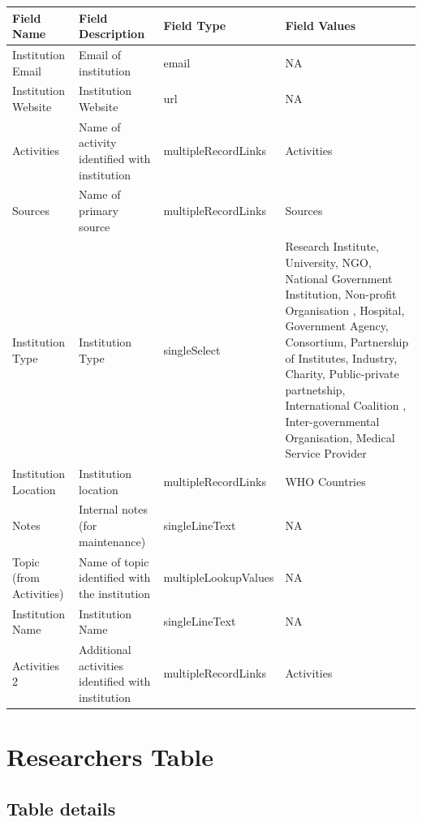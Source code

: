 \documentclass[
]{book}
\begin{document}
\begin{table}
\centering
\begin{tabular}{l|l|l|l}
\hline
\textbf{Field Name} & \textbf{Field Description} & \textbf{Field Type} & \textbf{Field Values}\\
\hline
Institution Email & Email of institution & email & NA\\
\hline
Institution Website & Institution Website & url & NA\\
\hline
Activities & Name of activity identified with institution & multipleRecordLinks & Activities\\
\hline
Sources & Name of primary source & multipleRecordLinks & Sources\\
\hline
Institution Type & Institution Type & singleSelect & Research Institute, University, NGO, National Government Institution, Non-profit Organisation , Hospital, Government Agency, Consortium, Partnership of Institutes, Industry, Charity, Public-private partnetship, International Coalition , Inter-governmental Organisation, Medical Service Provider\\
\hline
Institution Location & Institution location & multipleRecordLinks & WHO Countries\\
\hline
Notes & Internal notes (for maintenance) & singleLineText & NA\\
\hline
Topic (from Activities) & Name of topic identified with the institution & multipleLookupValues & NA\\
\hline
Institution Name & Institution Name & singleLineText & NA\\
\hline
Activities 2 & Additional activities identified with institution & multipleRecordLinks & Activities\\
\hline
\end{tabular}
\end{table}

\hypertarget{researchers-table}{%
\section{Researchers Table}\label{researchers-table}}

\hypertarget{table-details-6}{%
\subsection{Table details}\label{table-details-6}}
\end{document}
